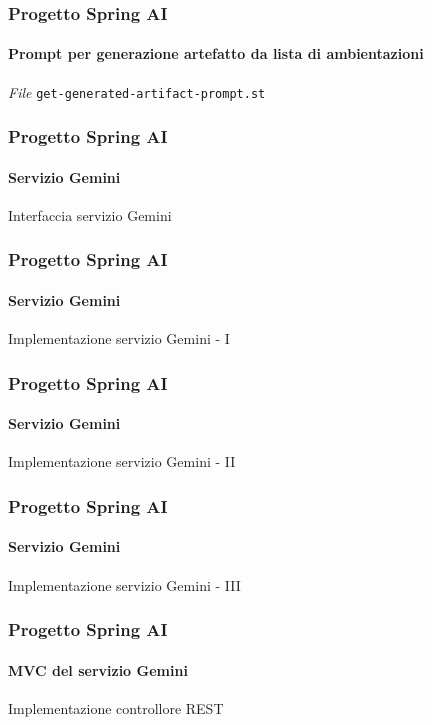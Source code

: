 %
\begin{frame}[t,fragile] \frametitle{Progetto Spring AI}
    \framesubtitle{Prompt per generazione artefatto da lista di ambientazioni}
        \begin{block}{\textit{File} \texttt{get-generated-artifact-prompt.st}}
			{\scriptsize}
    	\end{block}
\end{frame}
%
\begin{frame}[t,fragile] \frametitle{Progetto Spring AI}
    \framesubtitle{Servizio Gemini}
        \vspace*{-.7cm}
        \begin{block}{Interfaccia servizio Gemini}
{\tiny}
    \end{block}
\end{frame}
%
\begin{frame}[t,fragile] \frametitle{Progetto Spring AI}
    \framesubtitle{Servizio Gemini}
		\vspace*{-.7cm}
        \begin{block}{Implementazione servizio Gemini - I}
            {\tiny}
    \end{block}
\end{frame}
%
\begin{frame}[t,fragile] \frametitle{Progetto Spring AI}
    \framesubtitle{Servizio Gemini}
        \vspace*{-.7cm}
        \begin{block}{Implementazione servizio Gemini - II}
            {\tiny}
    \end{block}
\end{frame}
%
\begin{frame}[t,fragile] \frametitle{Progetto Spring AI}
    \framesubtitle{Servizio Gemini}
        \vspace*{-.7cm}
        \begin{block}{Implementazione servizio Gemini - III}
            {\tiny}
    \end{block}
\end{frame}
%
\begin{frame}[t,fragile] \frametitle{Progetto Spring AI}
    \framesubtitle{MVC del servizio Gemini}
    	\vspace*{-.7cm}
        \begin{block}{Implementazione controllore REST}
			{\tiny}
    	\end{block}
\end{frame}
